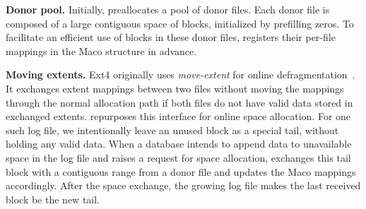 
\textbf{Donor pool.} Initially,
\odes preallocates a pool of donor files. 
Each donor file 
is composed of a large contiguous space of blocks, initialized
 by prefilling zeros.
To facilitate an efficient use of blocks in these donor files, \odes registers their per-file mappings  in the Maco structure in advance.




\textbf{Moving extents.} 
Ext4 originally uses \emph{move-extent} for online
defragmentation~\cite{ext4moveextent}. It exchanges extent mappings between two files without moving the mappings through the normal allocation path if both files do not have   valid data stored in exchanged extents.
\odes repurposes this interface for online space allocation.
For one such log file,
we intentionally  leave an unused block as a special tail, without holding any valid data.
When a database intends to append data to unavailable space in the log file
and raises a request for space allocation,
\odes exchanges this tail block with a contiguous range from a donor file and updates the Maco mappings
accordingly. After the space exchange, the growing log file makes the last received block be the new tail.

